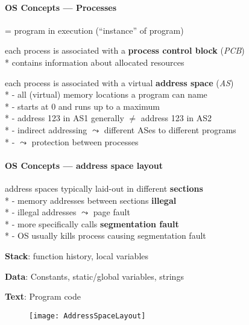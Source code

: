 \paragraph{OS Concepts --- Processes}
\begin{items}
	\item = program in execution ("`instance"' of program)
	\item each process is associated with a \textbf{process control block} (\emph{PCB})
		\\*
		contains information about allocated resources
	\item each process is associated with a virtual \textbf{address space} (\emph{AS})
		\\*
		- all (virtual) memory locations a program can name
		\\*
		- starts at 0 and runs up to a maximum
		\\*
		- address 123 in AS1 generally \( \neq \) address 123 in AS2
		\\*
		- indirect addressing \( \leadsto \) different ASes to different programs
		\\*
		- \( \leadsto \) protection between processes
\end{items}

\paragraph{OS Concepts --- address space layout}
\begin{items}
	\item address spaces typically laid-out in different \textbf{sections}
		\\*
		- memory addresses between sections \textbf{illegal}
		\\*
		- illegal addresses \( \leadsto \) page fault
		\\*
		- more specifically calls \textbf{segmentation fault}
		\\*
		- OS usually kills process causing segmentation fault
	\item \textbf{Stack}: function history, local variables
	\item \textbf{Data}: Constants, static/global variables, strings
	\item \textbf{Text}: Program code
	\begin{figure}[H]\centering\label{AddressSpaceLayout}\texttt{[image: AddressSpaceLayout]}\end{figure}
\end{items}

